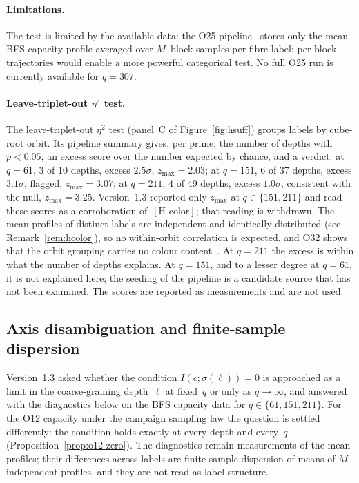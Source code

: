 \documentclass[11pt,a4paper]{article}
\theoremstyle{plain}
\theoremstyle{definition}
\theoremstyle{remark}
\begin{document}
    \paragraph{Limitations.}
      The test is limited by the available data:
      the O25 pipeline~\cite{Beau2026a29} stores only the mean BFS capacity
      profile averaged over $M$~block samples per fibre label;
      per-block trajectories would enable a more powerful categorical test.
      No full O25 run is currently available for $q = 307$.

    \paragraph{Leave-triplet-out $\eta^2$ test.}
      The leave-triplet-out $\eta^2$ test (panel~C of Figure~\ref{fig:hsuff}) groups labels by
      cube-root orbit.
      Its pipeline summary gives, per prime, the number of depths with $p < 0.05$, an excess
      score over the number expected by chance, and a verdict:
      at $q = 61$, 3 of 10 depths, excess $2.5\sigma$, $z_{\max} = 2.03$;
      at $q = 151$, 6 of 37 depths, excess $3.1\sigma$, flagged, $z_{\max} = 3.07$;
      at $q = 211$, 4 of 49 depths, excess $1.0\sigma$, consistent with the null, $z_{\max} = 3.25$.
      Version~1.3 reported only $z_{\max}$ at $q \in \{151, 211\}$ and read these scores as a
      corroboration of~$[\mathrm{H\text{-}color}]$; that reading is withdrawn.
      The mean profiles of distinct labels are independent and identically distributed (see
      Remark~\ref{rem:hcolor}), so no within-orbit correlation is expected, and O32 shows that
      the orbit grouping carries no colour content~\cite{Beau2026a36}.
      At $q = 211$ the excess is within what the number of depths explains.
      At $q = 151$, and to a lesser degree at $q = 61$, it is not explained here; the seeding of
      the pipeline is a candidate source that has not been examined.
      The scores are reported as measurements and are not used.

      \clearpage
  \subsection{Axis disambiguation and finite-sample dispersion}
  \label{sec:axis-disambig}

  Version~1.3 asked whether the condition $I(c;\sigma(\ell)) = 0$ is approached as a limit in
  the coarse-graining depth~$\ell$ at fixed~$q$ or only as $q \to \infty$, and answered with
  the diagnostics below on the BFS capacity data for $q \in \{61, 151, 211\}$.
  For the O12 capacity under the campaign sampling law the question is settled differently:
  the condition holds exactly at every depth and every~$q$ (Proposition~\ref{prop:o12-zero}).
  The diagnostics remain measurements of the mean profiles; their differences across labels
  are finite-sample dispersion of means of $M$ independent profiles, and they are not read as
  label structure.
\end{document}
